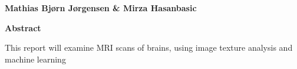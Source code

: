 \thispagestyle{plain}
\begin{center}
    \vspace{0.4cm}
    \textbf{Mathias Bjørn Jørgensen \& Mirza Hasanbasic}

    \vspace{0.9cm}
    \textbf{Abstract}
\end{center}

This report will examine MRI scans of brains, using image texture analysis and machine learning 